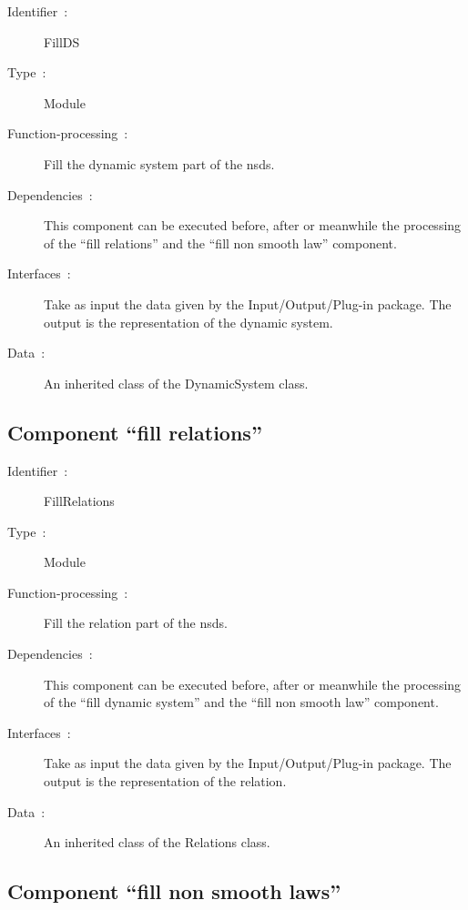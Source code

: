 		\begin{description}
	
		\item[Identifier~:]FillDS
		\item[Type~:]Module
		\item[Function-processing~:]Fill the dynamic system part of the \ac{nsds}.
		\item[Dependencies~:]This component can be executed before, after or meanwhile the processing of the ``fill relations'' and the ``fill non smooth law'' component.
		\item[Interfaces~:]Take as input the data given by the Input/Output/Plug-in package. The output is the representation of the dynamic system.
		\item[Data~:]An inherited class of the DynamicSystem class.

		\end{description}
  	
	
	\subsection{Component ``fill relations''}
	
		\begin{description}
	
		\item[Identifier~:]FillRelations
		\item[Type~:]Module
		\item[Function-processing~:]Fill the relation part of the \ac{nsds}.
		\item[Dependencies~:]This component can be executed before, after or meanwhile the processing of the ``fill dynamic system'' and the ``fill non smooth law'' component.
		\item[Interfaces~:]Take as input the data given by the Input/Output/Plug-in package. The output is the representation of the relation.
		\item[Data~:]An inherited class of the Relations class.

		\end{description}
	
	
  	\subsection{Component ``fill non smooth laws''}
	
